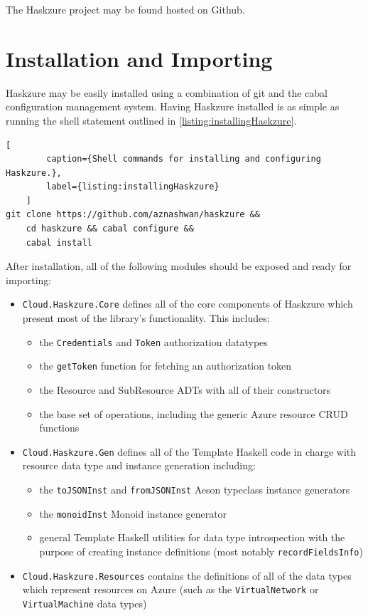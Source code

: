 \documentclass[11pt]{report}
\begin{document}
The Haskzure project may be found hosted on Github\cite{haskzure}.

\section{Installation and Importing}

Haskzure may be easily installed using a combination of git and the cabal
configuration management system. Having Haskzure installed is as simple as
running the shell statement outlined in \autoref{listing:installingHaskzure}.

\begin{lstlisting}[
        caption={Shell commands for installing and configuring Haskzure.},
        label={listing:installingHaskzure}
    ]
git clone https://github.com/aznashwan/haskzure &&
    cd haskzure && cabal configure &&
    cabal install
\end{lstlisting}

After installation, all of the following modules should be exposed and ready
for importing:

\begin{itemize}
    \item{} \texttt{Cloud.Haskzure.Core} defines all of the core components of
        Haskzure which present most of the library's functionality. This
        includes:
        \begin{itemize}
            \item{} the \texttt{Credentials} and \texttt{Token} authorization
                datatypes
            \item{} the \texttt{getToken} function for fetching an
                authorization token
            \item{} the Resource and SubResource ADTs with all of their
                constructors
            \item{} the base set of operations, including the generic Azure
                resource CRUD functions
        \end{itemize}
    \item{} \texttt{Cloud.Haskzure.Gen} defines all of the Template Haskell
        code in charge with resource data type and instance generation
        including:
        \begin{itemize}
            \item{} the \texttt{toJSONInst} and \texttt{fromJSONInst} Aeson
                typeclass instance generators
            \item{} the \texttt{monoidInst} Monoid instance generator
            \item{} general Template Haskell utilities for data type
                introspection with the purpose of creating instance definitions
                (most notably \texttt{recordFieldsInfo})
        \end{itemize}
    \item{} \texttt{Cloud.Haskzure.Resources} contains the definitions of all
        of the data types which represent resources on Azure (such as the
        \texttt{VirtualNetwork} or \texttt{VirtualMachine} data types)
\end{itemize}
\end{document}
